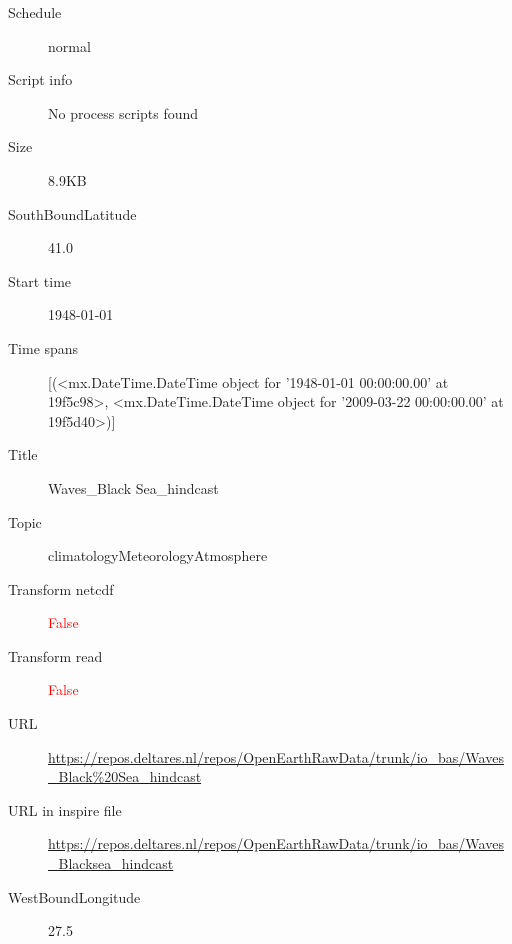 \documentclass[9]{report}
\begin{document}
\begin{description}
\begin{verbatim}
\end{verbatim}
  \item[Schedule] normal
  \item[Script info] No process scripts found
  \item[Size] 8.9KB
  \item[SouthBoundLatitude] 41.0
  \item[Start time] 1948-01-01
  \item[Time spans] [(<mx.DateTime.DateTime object for '1948-01-01 00:00:00.00' at 19f5c98>, <mx.DateTime.DateTime object for '2009-03-22 00:00:00.00' at 19f5d40>)]
  \item[Title]  Waves\_Black Sea\_hindcast 
  \item[Topic] climatologyMeteorologyAtmosphere
  \item[Transform netcdf] \textcolor{red}{False}
  \item[Transform read] \textcolor{red}{False}
  \item[URL] \href{https://repos.deltares.nl/repos/OpenEarthRawData/trunk/io\_bas/Waves\_Black\%20Sea\_hindcast}{https://repos.deltares.nl/repos/OpenEarthRawData/trunk/io\_bas/Waves\_Black\%20Sea\_hindcast}
  \item[URL in inspire file] \href{https://repos.deltares.nl/repos/OpenEarthRawData/trunk/io\_bas/Waves\_Blacksea\_hindcast}{https://repos.deltares.nl/repos/OpenEarthRawData/trunk/io\_bas/Waves\_Blacksea\_hindcast}
  \item[WestBoundLongitude] 27.5
\end{description}
\end{document}
